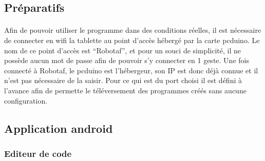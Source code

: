 \documentclass[a4paper]{article}
\begin{document}
\subsection{Préparatifs}

\paragraph{}
Afin de pouvoir utiliser le programme dans des conditions réelles, il est nécessaire de connecter en wifi la tablette au point d’accès hébergé par la carte pcduino. Le nom de ce point d’accès est “Robotaf”, et pour un souci de simplicité, il ne possède aucun mot de passe afin de pouvoir s’y connecter en 1 geste. 
Une fois connecté à Robotaf, le pcduino est l'hébergeur, son IP est donc déjà connue et il n’est pas nécessaire de la saisir. Pour ce qui est du port choisi il est défini à l’avance afin de permette le téléversement des programmes créés sans aucune configuration.

\subsection{Application android}

\subsubsection{Editeur de code}
\end{document}
